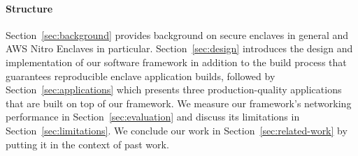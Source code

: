 \paragraph{Structure}

Section~\ref{sec:background} provides background on secure enclaves in general
and AWS Nitro Enclaves in particular.  Section~\ref{sec:design} introduces the
design and implementation of our software framework in addition to the build
process that guarantees reproducible enclave application builds, followed by
Section~\ref{sec:applications} which presents three production-quality
applications that are built on top of our framework.  We measure our framework's
networking performance in Section~\ref{sec:evaluation} and discuss its
limitations in Section~\ref{sec:limitations}.  We conclude our work in
Section~\ref{sec:related-work} by putting it in the context of past work.
